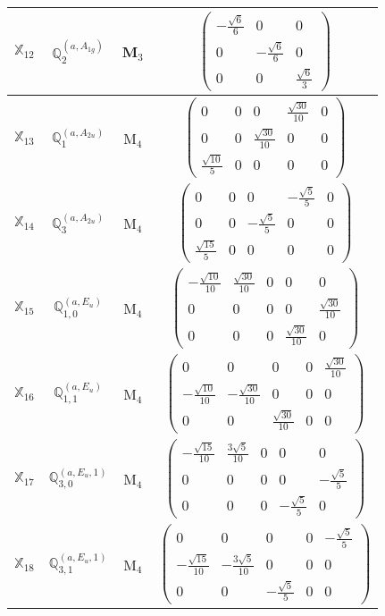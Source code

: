 \documentclass[fleqn,10pt,landscape]{article}
\begin{document}
\begin{itemize}
\begin{center}
\begin{longtable}{c|c|c|c}
$ \mathbb{X}_{12} $ & $\mathbb{Q}_{2}^{(a,A_{1g})}$ & M$_{3}$ & $\begin{pmatrix} - \frac{\sqrt{6}}{6} & 0 & 0 \\ 0 & - \frac{\sqrt{6}}{6} & 0 \\ 0 & 0 & \frac{\sqrt{6}}{3} \end{pmatrix}$ \\ \hline
$ \mathbb{X}_{13} $ & $\mathbb{Q}_{1}^{(a,A_{2u})}$ & M$_{4}$ & $\begin{pmatrix} 0 & 0 & 0 & \frac{\sqrt{30}}{10} & 0 \\ 0 & 0 & \frac{\sqrt{30}}{10} & 0 & 0 \\ \frac{\sqrt{10}}{5} & 0 & 0 & 0 & 0 \end{pmatrix}$ \\
$ \mathbb{X}_{14} $ & $\mathbb{Q}_{3}^{(a,A_{2u})}$ & M$_{4}$ & $\begin{pmatrix} 0 & 0 & 0 & - \frac{\sqrt{5}}{5} & 0 \\ 0 & 0 & - \frac{\sqrt{5}}{5} & 0 & 0 \\ \frac{\sqrt{15}}{5} & 0 & 0 & 0 & 0 \end{pmatrix}$ \\
$ \mathbb{X}_{15} $ & $\mathbb{Q}_{1,0}^{(a,E_{u})}$ & M$_{4}$ & $\begin{pmatrix} - \frac{\sqrt{10}}{10} & \frac{\sqrt{30}}{10} & 0 & 0 & 0 \\ 0 & 0 & 0 & 0 & \frac{\sqrt{30}}{10} \\ 0 & 0 & 0 & \frac{\sqrt{30}}{10} & 0 \end{pmatrix}$ \\
$ \mathbb{X}_{16} $ & $\mathbb{Q}_{1,1}^{(a,E_{u})}$ & M$_{4}$ & $\begin{pmatrix} 0 & 0 & 0 & 0 & \frac{\sqrt{30}}{10} \\ - \frac{\sqrt{10}}{10} & - \frac{\sqrt{30}}{10} & 0 & 0 & 0 \\ 0 & 0 & \frac{\sqrt{30}}{10} & 0 & 0 \end{pmatrix}$ \\
$ \mathbb{X}_{17} $ & $\mathbb{Q}_{3,0}^{(a,E_{u},1)}$ & M$_{4}$ & $\begin{pmatrix} - \frac{\sqrt{15}}{10} & \frac{3 \sqrt{5}}{10} & 0 & 0 & 0 \\ 0 & 0 & 0 & 0 & - \frac{\sqrt{5}}{5} \\ 0 & 0 & 0 & - \frac{\sqrt{5}}{5} & 0 \end{pmatrix}$ \\
$ \mathbb{X}_{18} $ & $\mathbb{Q}_{3,1}^{(a,E_{u},1)}$ & M$_{4}$ & $\begin{pmatrix} 0 & 0 & 0 & 0 & - \frac{\sqrt{5}}{5} \\ - \frac{\sqrt{15}}{10} & - \frac{3 \sqrt{5}}{10} & 0 & 0 & 0 \\ 0 & 0 & - \frac{\sqrt{5}}{5} & 0 & 0 \end{pmatrix}$ \\

\end{longtable}
\end{center}
\end{itemize}
\end{document}
